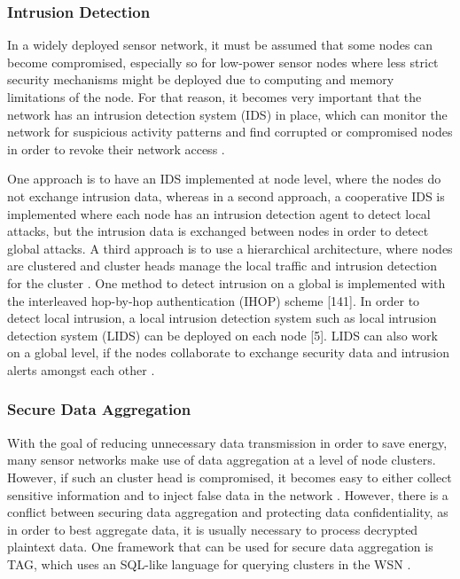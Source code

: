 \documentclass[12pt,a4paper,twoside]{report}
\begin{document}
\subsubsection{Intrusion Detection}
In a widely deployed sensor network, it must be assumed that some nodes can become compromised, especially so for low-power sensor nodes where less strict security mechanisms might be deployed due to computing and memory limitations of the node. For that reason, it becomes very important that the network has an intrusion detection system (IDS) in place, which can monitor the network for suspicious activity patterns and find corrupted or compromised nodes in order to revoke their network access \cite{sen:2009}.\par
One approach is to have an IDS implemented at node level, where the nodes do not exchange intrusion data, whereas in a second approach, a cooperative IDS is implemented where each node has an intrusion detection agent to detect local attacks, but the intrusion data is exchanged between nodes in order to detect global attacks. A third approach is to use a hierarchical architecture, where nodes are clustered and cluster heads manage the local traffic and intrusion detection for the cluster \cite{sen:2009}. One method to detect intrusion on a global is implemented with the interleaved hop-by-hop authentication (IHOP) scheme [141]. In order to detect local intrusion, a local intrusion detection system such as local intrusion detection system (LIDS) can be deployed on each node [5]. LIDS can also work on a global level, if the nodes collaborate to exchange security data and intrusion alerts amongst each other \cite{sen:2009}.\par
\subsubsection{Secure Data Aggregation}
With the goal of reducing unnecessary data transmission in order to save energy, many sensor networks make use of data aggregation at a level of node clusters. However, if such an cluster head is compromised, it becomes easy to either collect sensitive information and to inject false data in the network \cite{sen:2009}. However, there is a conflict between securing data aggregation and protecting data confidentiality, as in order to best aggregate data, it is usually necessary to process decrypted plaintext data. One framework that can be used for secure data aggregation is TAG, which uses an SQL-like language for querying clusters in the WSN \cite{sen:2009}.\par
\end{document}
